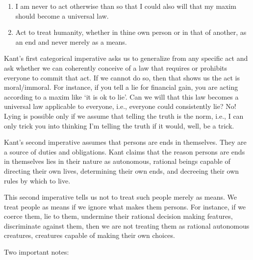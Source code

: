 \documentclass[9pt]{article}
\begin{document}
\begin{enumerate}
\def\labelenumi{\arabic{enumi}.}
\itemsep1pt\parskip0pt
\item
  I am never to act otherwise than so that I could also will that my
  maxim should become a universal law.
\item
  Act to treat humanity, whether in thine own person or in that of
  another, as an end and never merely as a means.
\end{enumerate}

Kant's first categorical imperative asks us to generalize from any
specific act and ask whether we can coherently conceive of a law that
requires or prohibits everyone to commit that act. If we cannot do so,
then that shows us the act is moral/immoral. For instance, if you tell a
lie for financial gain, you are acting according to a maxim like `it is
ok to lie'. Can we will that this law becomes a universal law applicable
to everyone, i.e., everyone could consistently lie? No! Lying is
possible only if we assume that telling the truth is the norm, i.e., I
can only trick you into thinking I'm telling the truth if it would,
well, be a trick.

Kant's second imperative assumes that persons are ends in themselves.
They are a source of duties and obligations. Kant claims that the reason
persons are ends in themselves lies in their nature as autonomous,
rational beings capable of directing their own lives, determining their
own ends, and decreeing their own rules by which to live.

This second imperative tells us not to treat such people merely as
means. We treat people as means if we ignore what makes them persons.
For instance, if we coerce them, lie to them, undermine their rational
decision making features, discriminate against them, then we are not
treating them as rational autonomous creatures, creatures capable of
making their own choices.

Two important notes:
\end{document}
